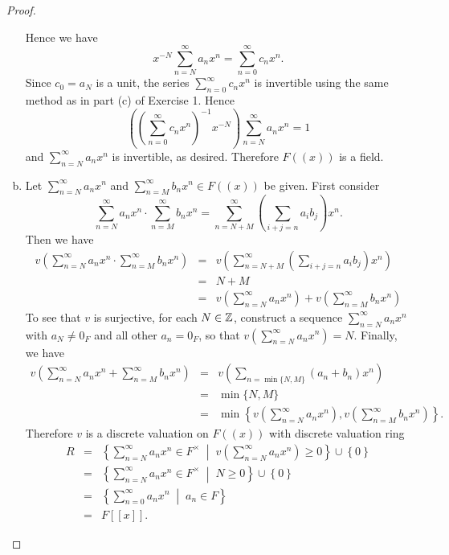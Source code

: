 \documentclass[10pt]{amsart}
\begin{document}
\begin{thm}
\begin{proof}
\begin{enumerate}[(a)]
      Hence we have $$x^{-N} \sum_{n=N}^\infty a_nx^n = \sum_{n=0}^\infty c_nx^n.$$
      Since $c_0 = a_N$ is a unit, the series $\sum_{n=0}^\infty c_nx^n$ is invertible using the same method as in part (c) of Exercise 1.
      Hence
      $$\left(\left(\sum_{n=0}^\infty c_nx^n\right)^{-1}x^{-N}\right) \sum_{n=N}^\infty a_nx^n = 1$$
      and $\sum_{n=N}^\infty a_nx^n$ is invertible, as desired.
      Therefore $F((x))$ is a field.
    \item
      Let $\sum_{n=N}^\infty a_nx^n$ and $\sum_{n=M}^\infty b_nx^n \in F((x))$ be given.
      First consider $$\sum_{n=N}^\infty a_nx^n \cdot \sum_{n=M}^\infty b_nx^n = \sum_{n=N+M}^\infty \left(\sum_{i + j = n} a_ib_j\right)x^n.$$
      Then we have
      \begin{eqnarray*}
        v\left(\sum_{n=N}^\infty a_nx^n \cdot \sum_{n=M}^\infty b_nx^n\right) &=& v\left(\sum_{n=N+M}^\infty \left(\sum_{i + j = n} a_ib_j\right)x^n\right)\\
        &=& N + M\\
        &=& v\left(\sum_{n=N}^\infty a_nx^n\right) + v\left(\sum_{n=M}^\infty b_nx^n\right)
      \end{eqnarray*}
      To see that $v$ is surjective, for each $N \in \mathbb{Z}$, construct a sequence $\sum_{n=N}^\infty a_nx^n$ with $a_N \neq 0_F$ and all other $a_n = 0_F$, so that $v(\sum_{n=N}^\infty a_nx^n) = N$.
      Finally, we have 
      \begin{eqnarray*}
        v\left(\sum_{n=N}^\infty a_nx^n + \sum_{n=M}^\infty b_nx^n\right) &=& v\left(\sum_{n=\min\{N,M\}}(a_n + b_n)x^n\right)\\
        &=& \min\{N,M\}\\
        &=& \min\left\{v\left(\sum_{n=N}^\infty a_nx^n\right), v\left(\sum_{n=M}^\infty b_nx^n \right)\right\}.
      \end{eqnarray*}
      Therefore $v$ is a discrete valuation on $F((x))$ with discrete valuation ring
      \begin{eqnarray*}
        R &=& \left\{\sum_{n=N}^\infty a_nx^n \in F^\times \;\middle\vert\; v\left(\sum_{n=N}^\infty a_nx^n\right) \geq 0 \right\} \cup \left\{0\right\}\\
        &=& \left\{\sum_{n=N}^\infty a_nx^n \in F^\times \;\middle\vert\; N \geq 0\right\} \cup \left\{0\right\}\\
        &=& \left\{\sum_{n=0}^\infty a_nx^n \;\middle\vert\; a_n \in F \right\}\\
        &=& F[[x]].
      \end{eqnarray*}
      
    \end{enumerate}
  \end{proof}
\end{thm}
\end{document}
